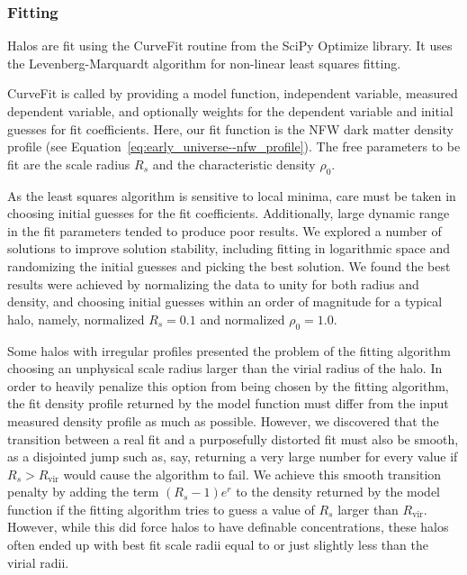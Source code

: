 \subsubsection{Fitting}
\label{subsubsec:analysis--profile_fitting--fitting}


Halos are fit using the CurveFit routine from the SciPy Optimize library.  It uses the Levenberg-Marquardt algorithm \citep{1963SIAM...11...431} for non-linear least squares fitting.

CurveFit is called by providing a model function, independent variable, measured dependent variable, and optionally weights for the dependent variable and initial guesses for fit coefficients.  Here, our fit function is the NFW dark matter density profile (see Equation~\ref{eq:early_universe--nfw_profile}).  The free parameters to be fit are the scale radius $R_{s}$ and the characteristic density $\rho_{0}$.

As the least squares algorithm is sensitive to local minima, care must be taken in choosing initial guesses for the fit coefficients.  Additionally, large dynamic range in the fit parameters tended to produce poor results.  We explored a number of solutions to improve solution stability, including fitting in logarithmic space and randomizing the initial guesses and picking the best solution.  We found the best results were achieved by normalizing the data to unity for both radius and density, and choosing initial guesses within an order of magnitude for a typical halo, namely, normalized $R_{s} = 0.1$ and normalized $\rho_{0} = 1.0$.

Some halos with irregular profiles presented the problem of the fitting algorithm choosing an unphysical scale radius larger than the virial radius of the halo.  In order to heavily penalize this option from being chosen by the fitting algorithm, the fit density profile returned by the model function must differ from the input measured density profile as much as possible.  However, we discovered that the transition between a real fit and a purposefully distorted fit must also be smooth, as a disjointed jump such as, say, returning a very large number for every value if $R_{s} > R_{\mathrm{vir}}$ would cause the algorithm to fail.  We achieve this smooth transition penalty by adding the term $(R_{s} - 1) e^{r}$ to the density returned by the model function if the fitting algorithm tries to guess a value of $R_{s}$ larger than $R_{\mathrm{vir}}$.  However, while this did force halos to have definable concentrations, these halos often ended up with best fit scale radii equal to or just slightly less than the virial radii.

